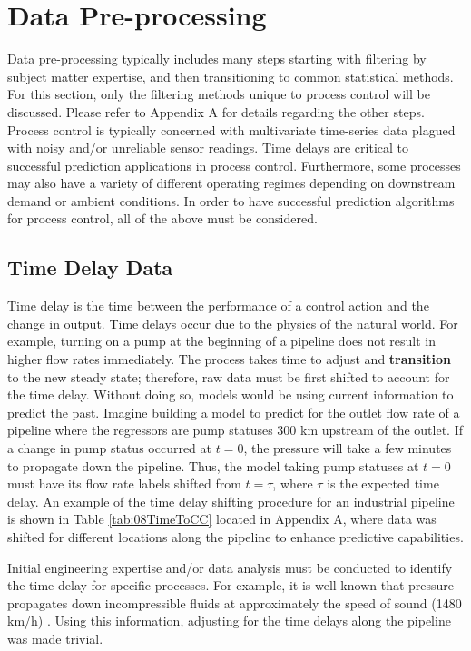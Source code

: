 \section{Data Pre-processing}
Data pre-processing typically includes many steps starting with filtering by subject matter expertise, and then transitioning to common statistical methods.  For this section, only the filtering methods unique to process control will be discussed. Please refer to Appendix A for details regarding the other steps. Process control is typically concerned with multivariate time-series data plagued with noisy and/or unreliable sensor readings. Time delays are critical to successful prediction applications in process control. Furthermore, some processes may also have a variety of different operating regimes depending on downstream demand or ambient conditions.  In order to have successful prediction algorithms for process control, all of the above must be considered.

\subsection{Time Delay Data}
Time delay is the time between the performance of a control action and the change in output. Time delays occur due to the physics of the natural world.  For example, turning on a pump at the beginning of a pipeline does not result in higher flow rates immediately.  The process takes time to adjust and \textbf{transition} to the new steady state; therefore, raw data must be first shifted to account for the time delay.  Without doing so, models would be using current information to predict the past.  Imagine building a model to predict for the outlet flow rate of a pipeline where the regressors are pump statuses 300 km upstream of the outlet.  If a change in pump status occurred at $t = 0$, the pressure will take a few minutes to propagate down the pipeline.  Thus, the model taking pump statuses at $t = 0$ must have its flow rate labels shifted from $t = \tau$, where $\tau$ is the expected time delay.  An example of the time delay shifting procedure for an industrial pipeline is shown in Table \ref{tab:08TimeToCC} located in Appendix A, where data was shifted for different locations along the pipeline to enhance predictive capabilities.

Initial engineering expertise and/or data analysis must be conducted to identify the time delay for specific processes.  For example, it is well known that pressure propagates down incompressible fluids at approximately the speed of sound (1480 km/h) \cite{fluid_mechanics}.  Using this information, adjusting for the time delays along the pipeline was made trivial.

